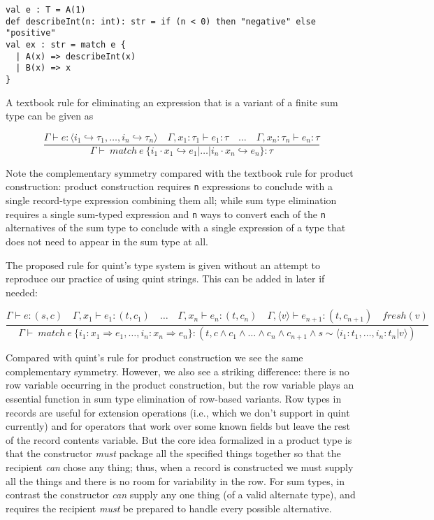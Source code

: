 \documentclass[11pt]{article}
\begin{document}
\begin{enumerate}
\begin{verbatim}
val e : T = A(1)
def describeInt(n: int): str = if (n < 0) then "negative" else "positive"
val ex : str = match e {
  | A(x) => describeInt(x)
  | B(x) => x
}
\end{verbatim}

A textbook rule for eliminating an expression that is a variant of a
finite sum type can be given as

$$
\frac{
\Gamma \vdash e \colon 
\langle i_1 \hookrightarrow \tau_1, \ldots, i_n \hookrightarrow \tau_n \rangle 
\quad 
\Gamma, x_1 : \tau_1 \vdash e_1 \colon \tau
\quad 
\ldots
\quad 
\Gamma, x_n : \tau_n \vdash e_n \colon \tau
}
{ \Gamma \vdash \ match \ e \ 
\{ i_1 \cdot x_1 \hookrightarrow e_1 | \ldots | i_n \cdot x_n \hookrightarrow e_n \} : \tau }
$$

Note the complementary symmetry compared with the textbook rule for
product construction: product construction requires \texttt{n} expressions to
conclude with a single record-type expression combining them all; while
sum type elimination requires a single sum-typed expression and \texttt{n} ways
to convert each of the \texttt{n} alternatives of the sum type to conclude with
a single expression of a type that does not need to appear in the sum
type at all.

The proposed rule for quint's type system is given without an attempt to
reproduce our practice of using quint strings. This can be added in
later if needed:

$$
\frac{
\Gamma \vdash e : (s, c) \quad
\Gamma, x_1 \vdash e_1 : (t, c_1) \quad \ldots \quad \Gamma, x_n \vdash e_n : (t, c_n) \quad
\Gamma, \langle v \rangle \vdash e_{n+1} : (t, c_{n+1}) \quad
fresh(v)
}{
\Gamma \vdash \ match \ e \ \{ i_1 : x_1 \Rightarrow e_1, \ldots, i_n : x_n \Rightarrow e_n \} : (t,
c \land c_1 \land \ldots \land c_n \land c_{n+1} \land
s \sim \langle i_1 : t_1, \ldots, i_n : t_n | v \rangle)
}
$$

Compared with quint's rule for product construction we see the same
complementary symmetry. However, we also see a striking difference:
there is no row variable occurring in the product construction, but the
row variable plays an essential function in sum type elimination of
row-based variants. Row types in records are useful for extension
operations (i.e., which we don't support in quint currently) and for
operators that work over some known fields but leave the rest of the
record contents variable. But the core idea formalized in a product type
is that the constructor \emph{must} package all the specified things together
so that the recipient \emph{can} chose any thing; thus, when a record is
constructed we must supply all the things and there is no room for
variability in the row. For sum types, in contrast the constructor \emph{can}
supply any one thing (of a valid alternate type), and requires the
recipient \emph{must} be prepared to handle every possible alternative.


\end{enumerate}
\end{document}

